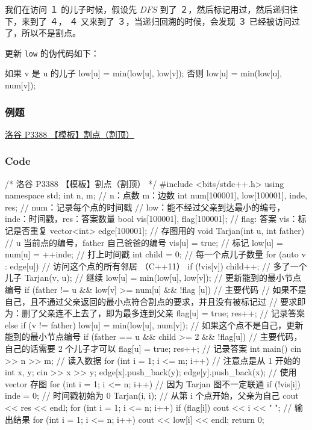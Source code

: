 我们在访问 １ 的儿子时候，假设先 $DFS$ 到了 ２，然后标记用过，然后递归往下，来到了 ４， ４ 又来到了 ３，当递归回溯的时候，会发现 ３ 已经被访问过了，所以不是割点。

更新 \texttt{low} 的伪代码如下：

\begin{cppcode}
如果 v 是 u 的儿子 low[u] = min(low[u], low[v]);
否则
low[u] = min(low[u], num[v]);
\end{cppcode}

\subsubsection{例题}

\href{https://www.luogu.org/problemnew/show/P3388}{洛谷 P3388 【模板】割点（割顶）}

\subsubsection{Code}

\begin{cppcode}
/*
洛谷 P3388 【模板】割点（割顶）
*/
#include <bits/stdc++.h>
using namespace std;
int n, m;  // n：点数 m：边数
int num[100001], low[100001], inde, res;
// num：记录每个点的时间戳
// low：能不经过父亲到达最小的编号，inde：时间戳，res：答案数量
bool vis[100001], flag[100001];  // flag: 答案 vis：标记是否重复
vector<int> edge[100001];        // 存图用的
void Tarjan(int u, int father)  // u 当前点的编号，father 自己爸爸的编号
{
  vis[u] = true;             // 标记
  low[u] = num[u] = ++inde;  // 打上时间戳
  int child = 0;             // 每一个点儿子数量
  for (auto v : edge[u])     // 访问这个点的所有邻居 （C++11）
  {
    if (!vis[v]) {
      child++;                       // 多了一个儿子
      Tarjan(v, u);                  // 继续
      low[u] = min(low[u], low[v]);  // 更新能到的最小节点编号
      if (father != u && low[v] >= num[u] &&
          !flag
              [u])  // 主要代码
                    // 如果不是自己，且不通过父亲返回的最小点符合割点的要求，并且没有被标记过
                    // 要求即为：删了父亲连不上去了，即为最多连到父亲
      {
        flag[u] = true;
        res++;  // 记录答案
      }
    } else if (v != father)
      low[u] =
          min(low[u], num[v]);  // 如果这个点不是自己，更新能到的最小节点编号
  }
  if (father == u && child >= 2 &&
      !flag[u])  // 主要代码，自己的话需要 2 个儿子才可以
  {
    flag[u] = true;
    res++;  // 记录答案
  }
}
int main() {
  cin >> n >> m;                // 读入数据
  for (int i = 1; i <= m; i++)  // 注意点是从 1 开始的
  {
    int x, y;
    cin >> x >> y;
    edge[x].push_back(y);
    edge[y].push_back(x);
  }                             // 使用 vector 存图
  for (int i = 1; i <= n; i++)  // 因为 Tarjan 图不一定联通
    if (!vis[i]) {
      inde = 0;      // 时间戳初始为 0
      Tarjan(i, i);  // 从第 i 个点开始，父亲为自己
    }
  cout << res << endl;
  for (int i = 1; i <= n; i++)
    if (flag[i]) cout << i << " ";  // 输出结果
  for (int i = 1; i <= n; i++) cout << low[i] << endl;
  return 0;
}
\end{cppcode}


